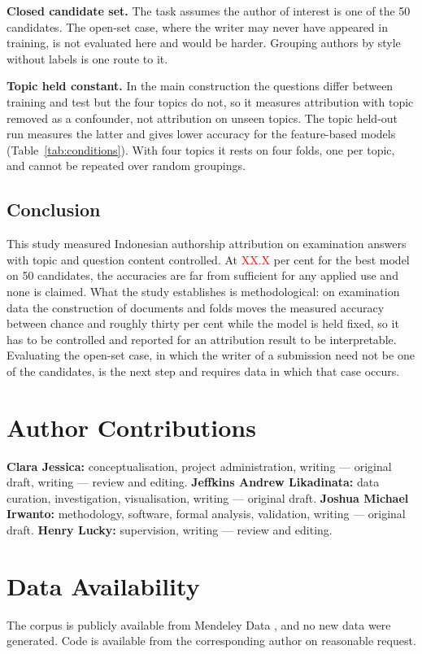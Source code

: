 \documentclass[conference]{IEEEtran}
\newcommand{\tbd}[1]{\textcolor{red}{#1}}
\begin{document}
\textbf{Closed candidate set.} The task assumes the author of interest is one of the 50 candidates. The open-set case, where the writer may never have appeared in training, is not evaluated here and would be harder. Grouping authors by style without labels \cite{Bertocco2023} is one route to it.

\textbf{Topic held constant.} In the main construction the questions differ between training and test but the four topics do not, so it measures attribution with topic removed as a confounder, not attribution on unseen topics. The topic held-out run measures the latter \cite{Altakrori2021,Barlas2021} and gives lower accuracy for the feature-based models (Table~\ref{tab:conditions}). With four topics it rests on four folds, one per topic, and cannot be repeated over random groupings.

\subsection{Conclusion}

This study measured Indonesian authorship attribution on examination answers with topic and question content controlled. At \tbd{XX.X} per cent for the best model on 50 candidates, the accuracies are far from sufficient for any applied use and none is claimed. What the study establishes is methodological: on examination data the construction of documents and folds moves the measured accuracy between chance and roughly thirty per cent while the model is held fixed, so it has to be controlled and reported for an attribution result to be interpretable. Evaluating the open-set case, in which the writer of a submission need not be one of the candidates, is the next step and requires data in which that case occurs.

\section*{Author Contributions}
\textbf{Clara Jessica:} conceptualisation, project administration, writing --- original draft, writing --- review and editing.
\textbf{Jeffkins Andrew Likadinata:} data curation, investigation, visualisation, writing --- original draft.
\textbf{Joshua Michael Irwanto:} methodology, software, formal analysis, validation, writing --- original draft.
\textbf{Henry Lucky:} supervision, writing --- review and editing.

\section*{Data Availability}
The corpus is publicly available from Mendeley Data \cite{Rahutomo2018}, and no new data were generated. Code is available from the corresponding author on reasonable request.
\end{document}
